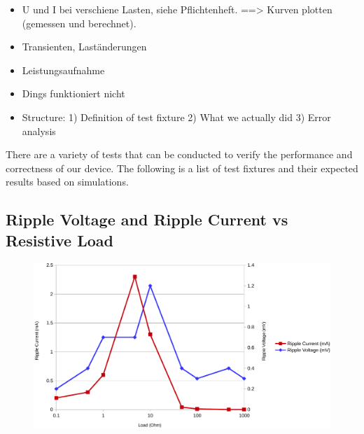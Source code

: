 \begin{itemize}
    \item
        U und I bei verschiene Lasten, siehe Pflichtenheft.
            ==> Kurven plotten (gemessen und berechnet).
    \item
        Transienten, Laständerungen
    \item
        Leistungsaufnahme
    \item
        Dings funktioniert nicht
    \item
        Structure:
            1) Definition of test fixture
            2) What we actually did
            3) Error analysis
\end{itemize}


There are a variety of tests that can be conducted to verify the performance and
correctness of our  device.  The  following is a list of test fixtures and their
expected results based on simulations.

\subsection{Ripple Voltage and Ripple Current vs Resistive Load}

\begin{figure}[th!]
    \centering
    \includegraphics[width=.7\textwidth]{images/sim/ripple-vs-load.pdf}
    \caption{}
\end{figure}

